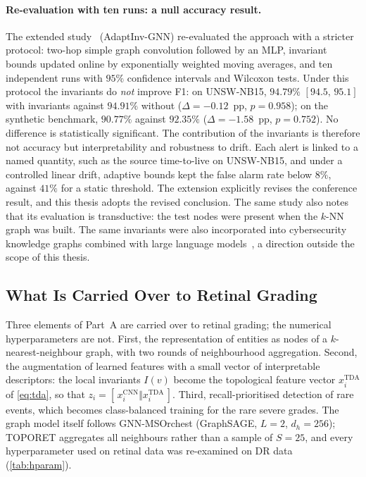 \paragraph{Re-evaluation with ten runs: a null accuracy result.}
The extended study~\cite{belhadj2026lnaiinv} (AdaptInv-GNN) re-evaluated the approach with
a stricter protocol: two-hop simple graph convolution followed by an MLP, invariant bounds
updated online by exponentially weighted moving averages, and ten independent runs with
$95\%$ confidence intervals and Wilcoxon tests. Under this protocol the invariants do
\emph{not} improve F1: on UNSW-NB15, $94.79\%$ $[94.5,\,95.1]$ with invariants against
$94.91\%$ without ($\Delta=-0.12$~pp, $p=0.958$); on the synthetic benchmark, $90.77\%$
against $92.35\%$ ($\Delta=-1.58$~pp, $p=0.752$). No difference is statistically
significant. The contribution of the invariants is therefore not accuracy but interpretability and
robustness to drift. Each alert is linked to a named quantity, such as the source
time-to-live on UNSW-NB15, and under a controlled linear drift, adaptive bounds kept the
false alarm rate below $8\%$, against $41\%$ for a static threshold. The
extension explicitly revises the conference result, and this thesis adopts the revised
conclusion. The same study also notes that its evaluation is transductive: the test
nodes were present when the $k$-NN graph was built. The same invariants were also
incorporated into cybersecurity knowledge graphs combined with large language
models~\cite{belhadj2025ijcnn}, a direction outside the scope of this thesis.

\subsection{What Is Carried Over to Retinal Grading}
\label{sec:transfer}

Three elements of Part~A are carried over to retinal grading; the numerical
hyperparameters are not. First, the representation of entities as nodes of a
$k$-nearest-neighbour graph, with two rounds of neighbourhood aggregation. Second, the
augmentation of learned features with a small vector of interpretable descriptors: the
local invariants $I(v)$ become the topological feature vector $x_i^{\mathrm{TDA}}$ of
\cref{eq:tda}, so that $z_i=[\,x_i^{\mathrm{CNN}}\Vert x_i^{\mathrm{TDA}}\,]$. Third,
recall-prioritised detection of rare events, which becomes class-balanced training for the
rare severe grades. The graph model itself follows GNN-MSOrchest (GraphSAGE, $L=2$, $d_h=256$); TOPORET
aggregates all neighbours rather than a sample of $S=25$, and every hyperparameter used on
retinal data was re-examined on DR data (\cref{tab:hparam}).

